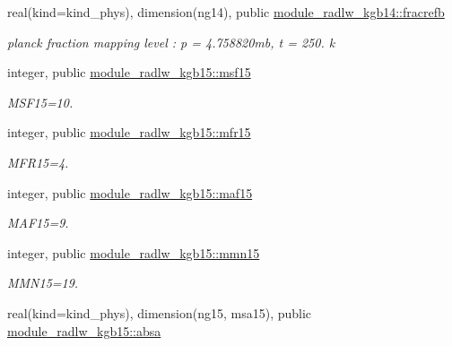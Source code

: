 \begin{Indent}
\begin{DoxyCompactItemize}
real(kind=kind\+\_\+phys), dimension(ng14), public \hyperlink{group__module__radlw__kgbnn_ga13a211bf8a903d0720fa72ac90e4fc3f}{module\+\_\+radlw\+\_\+kgb14\+::fracrefb}
\begin{DoxyCompactList}\small\item\em planck fraction mapping level \+: p = 4.\+758820mb, t = 250. k \end{DoxyCompactList}\item 
integer, public \hyperlink{group__module__radlw__kgbnn_gae1b588ee60974c2d451c89f842601e07}{module\+\_\+radlw\+\_\+kgb15\+::msf15}
\begin{DoxyCompactList}\small\item\em M\+S\+F15=10. \end{DoxyCompactList}\item 
integer, public \hyperlink{group__module__radlw__kgbnn_gad4d78009d0c7ffa27dbb228e68307675}{module\+\_\+radlw\+\_\+kgb15\+::mfr15}
\begin{DoxyCompactList}\small\item\em M\+F\+R15=4. \end{DoxyCompactList}\item 
integer, public \hyperlink{group__module__radlw__kgbnn_ga482858cf08fb1a14117dfbaa6a57fe8c}{module\+\_\+radlw\+\_\+kgb15\+::maf15}
\begin{DoxyCompactList}\small\item\em M\+A\+F15=9. \end{DoxyCompactList}\item 
integer, public \hyperlink{group__module__radlw__kgbnn_ga8ab45999cfc7b9db0f3d3b61ccf803e8}{module\+\_\+radlw\+\_\+kgb15\+::mmn15}
\begin{DoxyCompactList}\small\item\em M\+M\+N15=19. \end{DoxyCompactList}\item 
real(kind=kind\+\_\+phys), dimension(ng15, msa15), public \hyperlink{group__module__radlw__kgbnn_gaa6412ac501e2afed3d1b64b0cdcdab9e}{module\+\_\+radlw\+\_\+kgb15\+::absa}

\end{DoxyCompactItemize}
\end{Indent}
